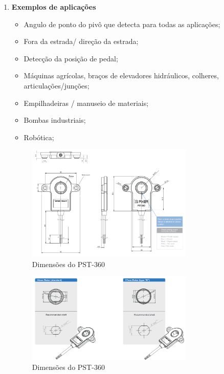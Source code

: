 \begin{enumerate}
\item \textbf{Exemplos de aplicações}

\begin{itemize}
  \item  Angulo de ponto do pivô que detecta para todas as aplicações;
  \item Fora da estrada/ direção da estrada;
  \item Detecção da posição de pedal;

  \item Máquinas agrícolas, braços de elevadores hidráulicos, colheres, articulações/junções;

  \item Empilhadeiras / manuseio de materiais;

  \item Bombas industriais;

  \item Robótica;

\end{itemize}


\begin{figure}[h]
  \centering
  \includegraphics[width=300px, scale=1]{figuras/pst_dimensoes}
  \caption{ Dimensões do PST-360 \cite{sensor_rotacao}}
\label{fig:pst_dimensoes}
\end{figure}

\begin{figure}[h]
  \centering
  \includegraphics[width=300px, scale=1]{figuras/pst_dimensoes2}
  \caption{ Dimensões do PST-360 \cite{sensor_rotacao}}
\label{fig:pst_dimensoes2}
\end{figure}


\end{enumerate}
